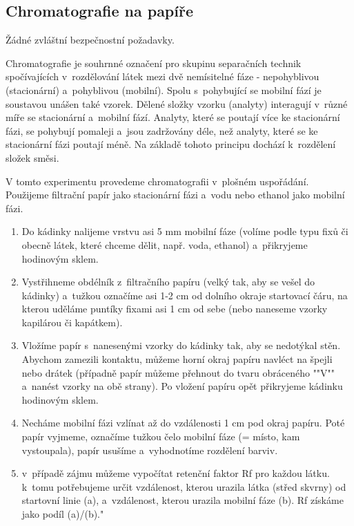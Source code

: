 \subsection{Chromatografie na papíře}


Žádné zvláštní bezpečnostní požadavky.

\hspace{-21pt} 

Chromatografie je souhrnné označení pro skupinu separačních technik spočívajících v~rozdělování látek mezi dvě nemísitelné fáze - nepohyblivou (stacionární) a~pohyblivou (mobilní). Spolu s~pohybující se mobilní fází je soustavou unášen také vzorek. Dělené složky vzorku (analyty) interagují v~různé míře se stacionární a~mobilní fází. Analyty, které se poutají více ke stacionární fázi, se pohybují pomaleji a~jsou zadržovány déle, než analyty, které se ke stacionární fázi poutají méně. Na základě tohoto principu dochází k~rozdělení složek směsi.

V tomto experimentu provedeme chromatografii v~plošném uspořádání. Použijeme filtrační papír jako stacionární fázi a~vodu nebo ethanol jako mobilní fázi. \newline

\hspace{-21pt} 

\begin{enumerate}
\item Do kádinky nalijeme vrstvu asi 5 mm mobilní fáze (volíme podle typu fixů či obecně látek, které chceme dělit, např. voda, ethanol) a~přikryjeme hodinovým sklem.
\item Vystřihneme obdélník z~filtračního papíru (velký tak, aby se vešel do kádinky) a~tužkou označíme asi 1-2 cm od dolního okraje startovací čáru, na kterou uděláme puntíky fixami asi 1 cm od sebe (nebo naneseme vzorky kapilárou či kapátkem).
\item Vložíme papír s~nanesenými vzorky do kádinky tak, aby se nedotýkal stěn. Abychom zamezili kontaktu, můžeme horní okraj papíru navléct na špejli nebo drátek (případně papír můžeme přehnout do tvaru obráceného ""V"" a~nanést vzorky na obě strany). Po vložení papíru opět přikryjeme kádinku hodinovým sklem.
\item Necháme mobilní fázi vzlínat až do vzdálenosti 1 cm pod okraj papíru. Poté papír vyjmeme, označíme tužkou čelo mobilní fáze (= místo, kam vystoupala), papír usušíme a~vyhodnotíme rozdělení barviv.
\item v~případě zájmu můžeme vypočítat retenční faktor Rf pro každou látku. k~tomu potřebujeme určit vzdálenost, kterou urazila látka (střed skvrny) od startovní linie (a), a~vzdálenost, kterou urazila mobilní fáze (b). Rf získáme jako podíl (a)/(b)."
\end{enumerate}
